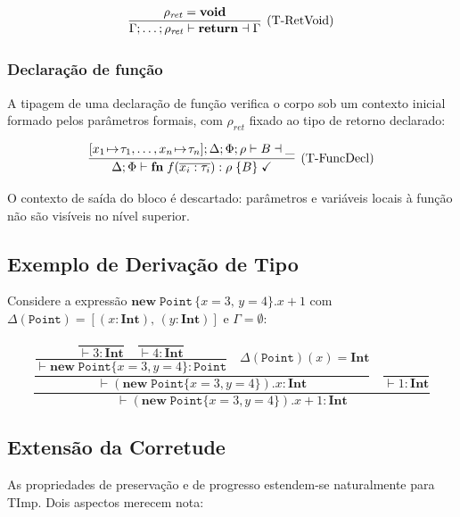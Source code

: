 \[
  \infer[\text{(T-RetVoid)}]
  {\Gamma;\ldots;\rho_{\mathit{ret}} \vdash \mathbf{return} \dashv \Gamma}
  {\rho_{\mathit{ret}} = \mathbf{void}}
\]

\subsubsection{Declaração de função}

A tipagem de uma declaração de função verifica o corpo sob um contexto
inicial formado pelos parâmetros formais, com \(\rho_{\mathit{ret}}\)
fixado ao tipo de retorno declarado:

\[
  \infer[\text{(T-FuncDecl)}]
  {\Delta;\Phi \vdash \mathbf{fn}\; f(\overline{x_i:\tau_i}): \rho\; \{B\} \;\checkmark}
  {[x_1\!\mapsto\!\tau_1,\ldots,x_n\!\mapsto\!\tau_n];\Delta;\Phi;\rho
   \vdash B \dashv \_}
\]

O contexto de saída do bloco é descartado: parâmetros e variáveis
locais à função não são visíveis no nível superior.

\subsection{Exemplo de Derivação de Tipo}

Considere a expressão \(\mathbf{new}\;
\mathtt{Point}\,\{x\!=\!3,\, y\!=\!4\}.x + 1\) com
\(\Delta(\mathtt{Point}) = [(x:\mathbf{Int}),\, (y:\mathbf{Int})]\) e
\(\Gamma = \emptyset\):

\[
  \dfrac{
    \dfrac{
      \dfrac{
        \dfrac{}{\vdash 3 : \mathbf{Int}}
        \quad
        \dfrac{}{\vdash 4 : \mathbf{Int}}
      }{\vdash \mathbf{new}\;\mathtt{Point}\{x\!=\!3,y\!=\!4\} : \mathtt{Point}}
      \quad \Delta(\mathtt{Point})(x) = \mathbf{Int}
    }{\vdash (\mathbf{new}\;\mathtt{Point}\{x\!=\!3,y\!=\!4\}).x : \mathbf{Int}}
    \quad
    \dfrac{}{\vdash 1 : \mathbf{Int}}
  }{\vdash (\mathbf{new}\;\mathtt{Point}\{x\!=\!3,y\!=\!4\}).x + 1 : \mathbf{Int}}
\]

\subsection{Extensão da Corretude}

As propriedades de preservação e de progresso estendem-se
naturalmente para TImp. Dois aspectos merecem nota:

